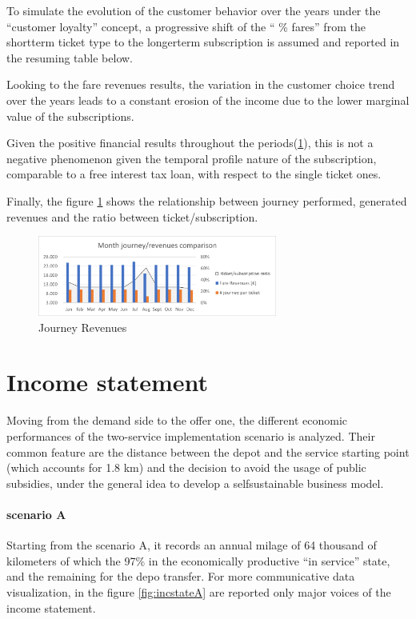 To simulate the evolution of the customer behavior over the years under the “customer loyalty” concept, a progressive shift of the “ \% fares” from the short\-term ticket type to the longer\-term subscription is assumed and reported in the resuming table below.

Looking to the fare revenues results, the variation in the customer choice trend over the years leads to a constant erosion of the income due to the lower marginal value of the subscriptions. 

Given the positive financial results throughout the periods(\ref{sec:Incomest}), this is not a negative phenomenon given the temporal profile nature of the subscription, comparable to a free interest tax loan, with respect to the single ticket ones. 

Finally, the figure \ref{fig:j_revenues} shows the relationship between journey performed, generated revenues and the ratio between ticket/subscription.

\begin{figure}[h]
    \centering
    \includegraphics[width=0.7\textwidth]{Images/financial/journey_revenues.png}
    \caption{Journey Revenues}
    \label{fig:j_revenues}
\end{figure}
\newpage
\section{Income statement}
\label{sec:Incomest}
Moving from the demand side to the offer one, the different economic performances of the two-service implementation scenario is analyzed. Their common feature are the distance between the depot and the service starting point (which accounts for 1.8 km) and the decision to avoid the usage of public subsidies, under the general idea to develop a self\-sustainable business model.

\paragraph{scenario A}
Starting from the scenario A, it records an annual milage of 64 thousand of kilometers of which the 97\% in the economically productive “in service” state, and the remaining for the depo transfer. For more communicative data visualization, in the figure \ref{fig:incstateA} are reported only major voices of the income statement.


